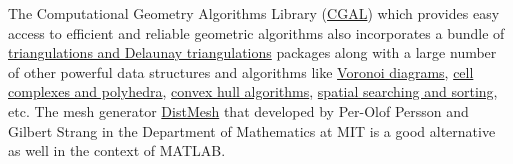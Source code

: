 	The Computational Geometry Algorithms Library 
	(\href{https://www.cgal.org/}{CGAL}) which provides 
	easy access to efficient and reliable geometric algorithms
	also incorporates a bundle of 
	\href{https://doc.cgal.org/latest/Manual/packages.html%
		#PartTriangulationsAndDelaunayTriangulations}{
		triangulations and Delaunay triangulations} packages 
	along with a large number of other powerful data structures and 
	algorithms like
	\href{https://doc.cgal.org/latest/Manual/packages.html#PartVoronoiDiagrams}
	{Voronoi diagrams}, 
	\href{https://doc.cgal.org/latest/Manual/packages.html#PartPolyhedra}
	{cell complexes and polyhedra},
	\href{https://doc.cgal.org/latest/Manual/packages.html%
		#PartConvexHullAlgorithms}{convex hull algorithms},
	\href{https://doc.cgal.org/latest/Manual/packages.html%
		#PartSearchStructures}{spatial searching and sorting}, etc.	
	The mesh generator
	\href{http://persson.berkeley.edu/distmesh/}{DistMesh} that developed by 
	Per-Olof Persson and Gilbert Strang in the Department of Mathematics at 
	MIT is a good alternative as well in the context of MATLAB. \vspace{5pt}
	
